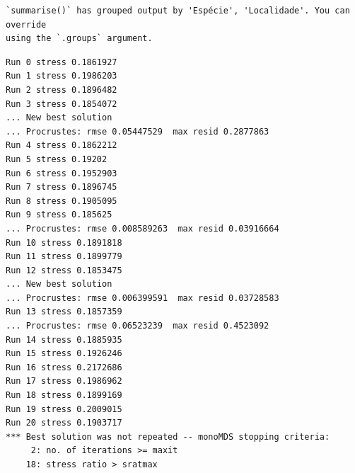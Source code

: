 \documentclass[
  letterpaper,
  DIV=11,
  numbers=noendperiod]{scrartcl}
\newenvironment{Shaded}{\begin{snugshade}}{\end{snugshade}}
\newcommand{\AttributeTok}[1]{\textcolor[rgb]{0.40,0.45,0.13}{#1}}
\newcommand{\ConstantTok}[1]{\textcolor[rgb]{0.56,0.35,0.01}{#1}}
\newcommand{\FunctionTok}[1]{\textcolor[rgb]{0.28,0.35,0.67}{#1}}
\newcommand{\NormalTok}[1]{\textcolor[rgb]{0.00,0.23,0.31}{#1}}
\newcommand{\OtherTok}[1]{\textcolor[rgb]{0.00,0.23,0.31}{#1}}
\newcommand{\SpecialCharTok}[1]{\textcolor[rgb]{0.37,0.37,0.37}{#1}}
\newcommand{\StringTok}[1]{\textcolor[rgb]{0.13,0.47,0.30}{#1}}
\begin{document}
\begin{verbatim}
`summarise()` has grouped output by 'Espécie', 'Localidade'. You can override
using the `.groups` argument.
\end{verbatim}

\begin{Shaded}
\end{Shaded}

\begin{verbatim}
Run 0 stress 0.1861927 
Run 1 stress 0.1986203 
Run 2 stress 0.1896482 
Run 3 stress 0.1854072 
... New best solution
... Procrustes: rmse 0.05447529  max resid 0.2877863 
Run 4 stress 0.1862212 
Run 5 stress 0.19202 
Run 6 stress 0.1952903 
Run 7 stress 0.1896745 
Run 8 stress 0.1905095 
Run 9 stress 0.185625 
... Procrustes: rmse 0.008589263  max resid 0.03916664 
Run 10 stress 0.1891818 
Run 11 stress 0.1899779 
Run 12 stress 0.1853475 
... New best solution
... Procrustes: rmse 0.006399591  max resid 0.03728583 
Run 13 stress 0.1857359 
... Procrustes: rmse 0.06523239  max resid 0.4523092 
Run 14 stress 0.1885935 
Run 15 stress 0.1926246 
Run 16 stress 0.2172686 
Run 17 stress 0.1986962 
Run 18 stress 0.1899169 
Run 19 stress 0.2009015 
Run 20 stress 0.1903717 
*** Best solution was not repeated -- monoMDS stopping criteria:
     2: no. of iterations >= maxit
    18: stress ratio > sratmax
\end{verbatim}
\end{document}
